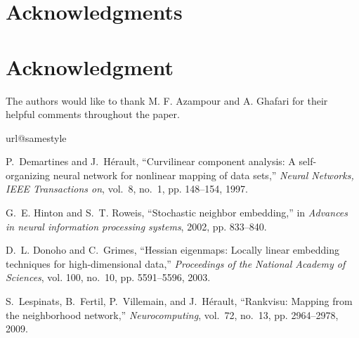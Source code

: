 \documentclass[10pt,journal,cspaper,compsoc]{IEEEtran}
\begin{document}
\ifCLASSOPTIONcompsoc
\section*{Acknowledgments}
\else
\section*{Acknowledgment}
\fi


The authors would like to thank M. F. Azampour and A. Ghafari for their helpful comments throughout the paper.


\ifCLASSOPTIONcaptionsoff
  \newpage
\fi







{\small
\begin{thebibliography}{10}
\providecommand{\url}[1]{#1}
\csname url@samestyle\endcsname
\providecommand{\newblock}{\relax}
\providecommand{\bibinfo}[2]{#2}
\providecommand{\BIBentrySTDinterwordspacing}{\spaceskip=0pt\relax}
\providecommand{\BIBentryALTinterwordstretchfactor}{4}
\providecommand{\BIBentryALTinterwordspacing}{\spaceskip=\fontdimen2\font plus
\BIBentryALTinterwordstretchfactor\fontdimen3\font minus
  \fontdimen4\font\relax}
\providecommand{\BIBforeignlanguage}[2]{{\expandafter\ifx\csname l@#1\endcsname\relax
\typeout{** WARNING: IEEEtran.bst: No hyphenation pattern has been}\typeout{** loaded for the language `#1'. Using the pattern for}\typeout{** the default language instead.}\else
\language=\csname l@#1\endcsname
\fi
#2}}
\providecommand{\BIBdecl}{\relax}
\BIBdecl

P.~Demartines and J.~H{\'e}rault, ``Curvilinear component analysis: A
  self-organizing neural network for nonlinear mapping of data sets,''
  \emph{Neural Networks, IEEE Transactions on}, vol.~8, no.~1, pp. 148--154,
  1997.

G.~E. Hinton and S.~T. Roweis, ``Stochastic neighbor embedding,'' in
  \emph{Advances in neural information processing systems}, 2002, pp. 833--840.

D.~L. Donoho and C.~Grimes, ``Hessian eigenmaps: Locally linear embedding
  techniques for high-dimensional data,'' \emph{Proceedings of the National
  Academy of Sciences}, vol. 100, no.~10, pp. 5591--5596, 2003.

S.~Lespinats, B.~Fertil, P.~Villemain, and J.~H{\'e}rault, ``Rankvisu: Mapping
  from the neighborhood network,'' \emph{Neurocomputing}, vol.~72, no.~13, pp.
  2964--2978, 2009.


\end{thebibliography}}
\end{document}

